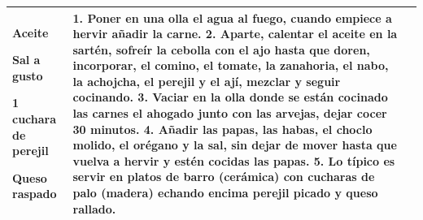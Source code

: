 \documentclass[menu.tex]{subfiles}
\begin{document}
\begin{tabular} {p{3.5cm} p{4cm} p{9cm}}
\begin{compactitem}
\begin{footnotesize}
                \item Aceite
                \item Sal a gusto
                \item 1 cuchara de perejil
                \item Queso raspado
      \end{footnotesize}
        \end{compactitem}&
        \vspace{-1.5cm}
        1. Poner en una olla el agua al fuego, cuando empiece a hervir añadir la carne.
        2. Aparte, calentar el aceite en la sartén, sofreír la cebolla con el ajo hasta que doren, incorporar, el comino, el tomate, la zanahoria, el nabo, la achojcha, el perejil y el ají, mezclar y seguir cocinando.
        3. Vaciar en la olla donde se están cocinado las carnes el ahogado junto con las arvejas, dejar cocer 30 minutos.
        4. Añadir las papas, las habas, el choclo molido, el orégano y la sal, sin dejar de mover hasta que vuelva a hervir y estén cocidas las papas.
        5. Lo típico es servir en platos de barro (cerámica) con cucharas de palo (madera) echando encima perejil picado y queso rallado. \\
        \hline
        

\end{tabular}
\end{document}

